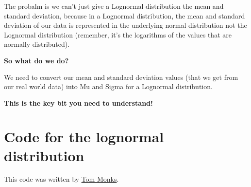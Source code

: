 \documentclass[
  letterpaper,
  DIV=11,
  numbers=noendperiod]{scrreprt}
\begin{document}
The probalm is we can't just give a Lognormal distribution the mean and
standard deviation, because in a Lognormal distribution, the mean and
standard deviation of our data is represented in the underlying normal
distribution not the Lognormal distribution (remember, it's the
logarithms of the values that are normally distributed).

\begin{tcolorbox}[enhanced jigsaw, colframe=quarto-callout-tip-color-frame, bottomtitle=1mm, breakable, rightrule=.15mm, coltitle=black, colbacktitle=quarto-callout-tip-color!10!white, opacityback=0, leftrule=.75mm, arc=.35mm, toptitle=1mm, title=\textcolor{quarto-callout-tip-color}{\faLightbulb}\hspace{0.5em}{Tip}, titlerule=0mm, colback=white, toprule=.15mm, bottomrule=.15mm, left=2mm, opacitybacktitle=0.6]

\textbf{So what do we do?}

We need to convert our mean and standard deviation values (that we get
from our real world data) into Mu and Sigma for a Lognormal
distribution.

\textbf{This is the key bit you need to understand!}

\end{tcolorbox}

\section{Code for the lognormal
distribution}\label{code-for-the-lognormal-distribution}

This code was written by
\href{https://orcid.org/0000-0003-2631-4481}{Tom Monks}.
\end{document}

